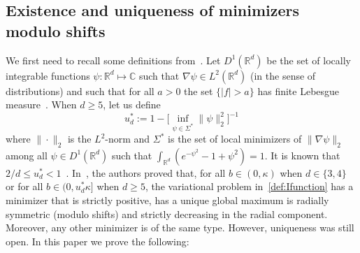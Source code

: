 \documentclass[a4paper,11pt]{amsart}
\numberwithin{equation}{section}
\newcommand{\bbC}{{\ensuremath{\mathbb C}} }
\newcommand{\bbR}{{\ensuremath{\mathbb R}} }
\newcommand{\gk}{\kappa}
\newcommand{\gS}{\Sigma}
\newcommand{\8}{\infty}
\newcommand{\beq}{\begin{equation}}
\newcommand{\eeq}{\end{equation}}
\begin{document}
\subsection{Existence and uniqueness of minimizers modulo shifts}
\label{sec:exi-uni-min}
We first need to recall some definitions from~\cite{BBH2001}. Let $D^1(\bbR^d)$ be the set of locally integrable functions $\psi\colon \bbR^d\mapsto \bbC$ such that $\nabla \psi \in L^2(\bbR^d)$ (in the sense of distributions) and such that for all $a>0$ the set $\{|f|>a\}$ has finite Lebesgue measure~\cite{LiebLoss}. When $d\ge 5$, let us define
\beq
\label{def:u*d}
u_d^* := 1- \Big[\inf_{\psi\in\gS^*}\|\psi\|_2^2\Big]^{-1}
\eeq
where $\|\cdot\|_2$ is the $L^2$-norm and $\gS^*$ is the set of local minimizers of $\|\nabla\psi\|_2$ among all $\psi\in D^1(\bbR^d)$ such that $\int_{\bbR^d} (e^{-\psi^2}-1+\psi^2) = 1$. It is known that $2/d \le u_d^* < 1$~\cite[Theorem 5]{BBH2001}. In~\cite[Theorems~4 and 5]{BBH2001}, the authors proved that, for all $b\in(0,\gk)$ when $d\in\{3,4\}$ or for all $b\in(0,u_d^*\gk]$ when $d\ge 5$, the variational problem in~\eqref{def:Ifunction} has a minimizer that is strictly positive, has a unique global maximum is radially symmetric (modulo shifts) and strictly decreasing in the radial component. Moreover, any other minimizer is of the same type. However, uniqueness was still open. In this paper we prove the following:
\end{document}
